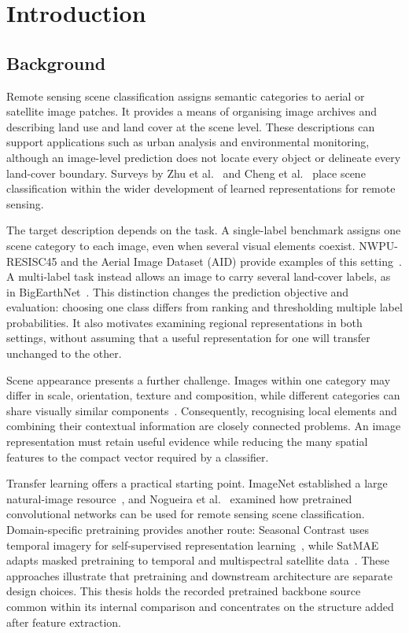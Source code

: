 \chapter{Introduction}
\label{chap:introduction}

\section{Background}

Remote sensing scene classification assigns semantic categories to aerial or
satellite image patches. It provides a means of organising image archives and
describing land use and land cover at the scene level. These descriptions can
support applications such as urban analysis and environmental monitoring,
although an image-level prediction does not locate every object or delineate
every land-cover boundary. Surveys by Zhu et al.~\cite{zhu2017deeprs} and
Cheng et al.~\cite{cheng2020scene} place scene classification within the wider
development of learned representations for remote sensing.

The target description depends on the task. A single-label benchmark assigns
one scene category to each image, even when several visual elements coexist.
NWPU-RESISC45 and the Aerial Image Dataset (AID) provide examples of this
setting~\cite{cheng2017nwpu,xia2017aid}. A multi-label task instead allows an
image to carry several land-cover labels, as in
BigEarthNet~\cite{sumbul2019bigearthnet,sumbul2021bigearthnetmm}. This
distinction changes the prediction objective and evaluation: choosing one
class differs from ranking and thresholding multiple label probabilities.
It also motivates examining regional representations in both settings,
without assuming that a useful representation for one will transfer
unchanged to the other.

Scene appearance presents a further challenge. Images within one category
may differ in scale, orientation, texture and composition, while different
categories can share visually similar components~\cite{cheng2017nwpu}.
Consequently, recognising local elements and combining their contextual
information are closely connected problems. An image representation must
retain useful evidence while reducing the many spatial features to the
compact vector required by a classifier.

Transfer learning offers a practical starting point. ImageNet established a
large natural-image resource~\cite{deng2009imagenet}, and Nogueira
et al.~\cite{nogueira2017exploiting} examined how pretrained convolutional
networks can be used for remote sensing scene classification. Domain-specific
pretraining provides another route: Seasonal Contrast uses temporal imagery
for self-supervised representation learning~\cite{manas2021seco}, while
SatMAE adapts masked pretraining to temporal and multispectral satellite
data~\cite{cong2022satmae}. These approaches illustrate that pretraining and
downstream architecture are separate design choices. This thesis holds the
recorded pretrained backbone source common within its internal comparison
and concentrates on the structure added after feature extraction.

